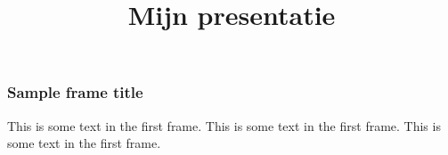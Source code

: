 \documentclass{beamer}
\title{Mijn presentatie}
\begin{document}
\frame{\titlepage}


\begin{frame}
\frametitle{Sample frame title}
This is some text in the first frame. This is some text in the first frame. This is some text in the first frame.
\end{frame}
\end{document}
